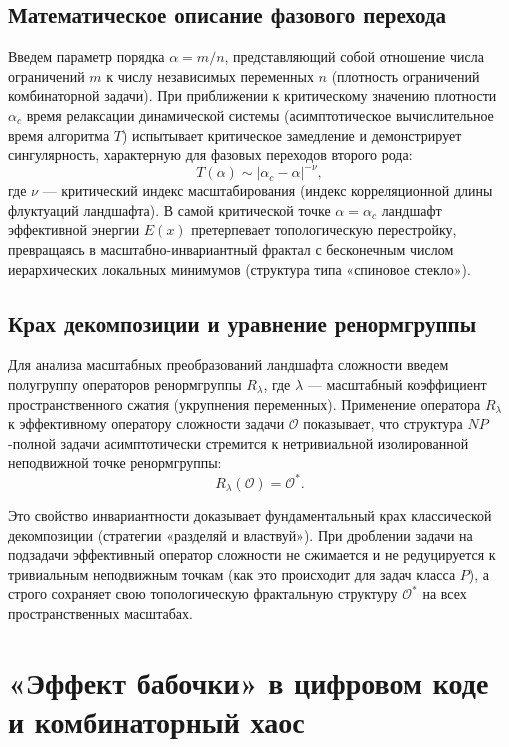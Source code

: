 \documentclass[12pt,a4paper]{article}
\begin{document}
\subsection{Математическое описание фазового перехода}

Введем параметр порядка $\alpha = m/n$, представляющий собой отношение числа ограничений $m$ к числу независимых переменных $n$ (плотность ограничений комбинаторной задачи). При приближении к критическому значению плотности $\alpha_c$ время релаксации динамической системы (асимптотическое вычислительное время алгоритма $T$) испытывает критическое замедление и демонстрирует сингулярность, характерную для фазовых переходов второго рода:
\begin{equation}
T(\alpha) \sim |\alpha_c - \alpha|^{-\nu},
\end{equation}
где $\nu$ — критический индекс масштабирования (индекс корреляционной длины флуктуаций ландшафта). В самой критической точке $\alpha = \alpha_c$ ландшафт эффективной энергии $E(x)$ претерпевает топологическую перестройку, превращаясь в масштабно-инвариантный фрактал с бесконечным числом иерархических локальных минимумов (структура типа «спиновое стекло»).

\subsection{Крах декомпозиции и уравнение ренормгруппы}

Для анализа масштабных преобразований ландшафта сложности введем полугруппу операторов ренормгруппы $R_\lambda$, где $\lambda$ — масштабный коэффициент пространственного сжатия (укрупнения переменных). Применение оператора $R_\lambda$ к эффективному оператору сложности задачи $\mathcal{O}$ показывает, что структура $NP$-полной задачи асимптотически стремится к нетривиальной изолированной неподвижной точке ренормгруппы:
\begin{equation}
R_\lambda(\mathcal{O}) = \mathcal{O}^*.
\end{equation}

Это свойство инвариантности доказывает фундаментальный крах классической декомпозиции (стратегии «разделяй и властвуй»). При дроблении задачи на подзадачи эффективный оператор сложности не сжимается и не редуцируется к тривиальным неподвижным точкам (как это происходит для задач класса $P$), а строго сохраняет свою топологическую фрактальную структуру $\mathcal{O}^*$ на всех пространственных масштабах.

\section{«Эффект бабочки» в цифровом коде и комбинаторный хаос}
\end{document}
